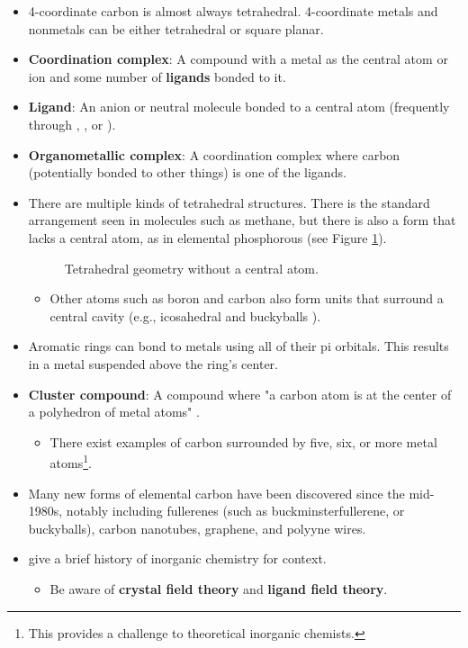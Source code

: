 \documentclass[../notes.tex]{subfiles}
\begin{document}
\begin{itemize}
\begin{itemize}
    \end{itemize}
    \item 4-coordinate carbon is almost always tetrahedral. 4-coordinate metals and nonmetals can be either tetrahedral or square planar.
    \item \textbf{Coordination complex}: A compound with a metal as the central atom or ion and some number of \textbf{ligands} bonded to it.
    \item \textbf{Ligand}: An anion or neutral molecule bonded to a central atom (frequently through , , or ).
    \item \textbf{Organometallic complex}: A coordination complex where carbon (potentially bonded to other things) is one of the ligands.
    \item There are multiple kinds of tetrahedral structures. There is the standard arrangement seen in molecules such as methane, but there is also a form that lacks a central atom, as in elemental phosphorous  (see Figure \ref{fig:tetrahedralNoCentral}).
    \begin{figure}[h!]
        \centering
        \footnotesize
        \caption{Tetrahedral geometry without a central atom.}
        \label{fig:tetrahedralNoCentral}
    \end{figure}
    \begin{itemize}
        \item Other atoms such as boron and carbon also form units that surround a central cavity (e.g., icosahedral  and buckyballs ).
    \end{itemize}
    \item Aromatic rings can bond to metals using all of their pi orbitals. This results in a metal suspended above the ring's center.
    \item \textbf{Cluster compound}: A compound where "a carbon atom is at the center of a polyhedron of metal atoms" \parencite[3]{bib:MiesslerFischerTarr}.
    \begin{itemize}
        \item There exist examples of carbon surrounded by five, six, or more metal atoms\footnote{This provides a challenge to theoretical inorganic chemists.}.
    \end{itemize}
    \item Many new forms of elemental carbon have been discovered since the mid-1980s, notably including fullerenes (such as buckminsterfullerene, or buckyballs), carbon nanotubes, graphene, and polyyne wires.
    \item \textcite{bib:MiesslerFischerTarr} give a brief history of inorganic chemistry for context.
    \begin{itemize}
        \item Be aware of \textbf{crystal field theory} and \textbf{ligand field theory}.
    \end{itemize}
\end{itemize}
\newpage
\end{document}
